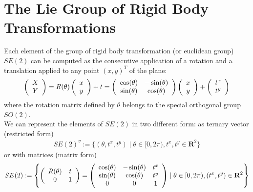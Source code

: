 \section{The Lie Group of Rigid Body Transformations}\label{se:rigid_body_transformations}
Each element of the group of rigid body transformation (or euclidean group) $SE(2)$ can be computed as the consecutive application of a rotation and a translation applied to any point $(x,y)^T$ of the plane:
\begin{align*}
\left (  
\begin{array} {c }
X \\
Y
\end{array}
\right )  
= 
R(\theta)
\left (  
\begin{array} {c }
x \\
y
\end{array}
\right ) 
+
t
=
\left (
\begin{array} {c c }
\cos(\theta) & - \sin(\theta) \\
\sin(\theta) & \cos(\theta) 
\end{array}
\right )
\left (  
\begin{array} {c }
x \\
y
\end{array}
\right ) 
+
\left (  
\begin{array} {c }
t^x \\
t^y
\end{array}
\right ) 
\end{align*}
where the rotation matrix defined by $\theta$ belongs to the special orthogonal group $SO(2)$.\\
We can represent the elements of $SE(2)$ in two different form: as ternary vector (restricted form) 
\begin{align*}
SE(2)^{v} 
:=
\{ (\theta, t^x, t^y) \mid \theta \in [0, 2\pi),   t^x, t^y \in\mathbf{R}^2  \}
\end{align*}
or with matrices (matrix form)
\begin{align*}
SE(2) 
:= 
\left \{
\left (
\begin{array} {c c }
R(\theta) & t \\
0 & 1 
\end{array}
\right )
=
\left (
\begin{array} {c c c }
\cos(\theta) & - \sin(\theta)& t^{x} \\
\sin(\theta) & \cos(\theta) & t^{y}\\
0 & 0 &  1
\end{array}
\right )
\mid
\theta \in  [0, 2\pi), (t^x, t^y) \in\mathbf{R}^2
\right \}
\end{align*}
